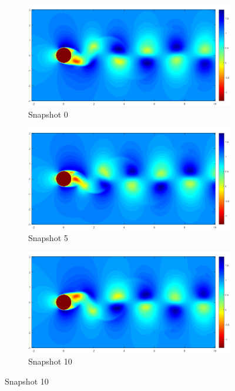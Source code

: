 \documentclass[letterpaper,12pt,peerreviewca,draftcls]{IEEEtran}
\begin{document}
\begin{figure}[h] %
	\centering
	\begin{subfigure}[t]{0.23\textwidth}
		\includegraphics[width=\linewidth]{"Figure S7a"}
		\caption{Snapshot 0}
	\end{subfigure}
	\begin{subfigure}[t]{0.23\textwidth}
		\includegraphics[width=\linewidth]{"Figure S7b"}
		\caption{Snapshot 5}
	\end{subfigure}
	\begin{subfigure}[t]{0.23\textwidth}
		\includegraphics[width=\linewidth]{"Figure S7c"}
		\caption{Snapshot 10}

\end{subfigure}
\end{figure}
\end{document}
